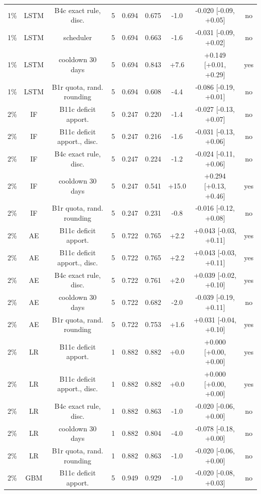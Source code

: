 \documentclass[10pt,onecolumn,letterpaper]{article}
\begin{document}
\begin{table}[!t]
{\begin{tabular}{lcccccccc}
1\% & LSTM & B4c exact rule, disc. & 5 & 0.694 & 0.675 & -1.0 & -0.020 [-0.09, +0.05] & no \\
1\% & LSTM & scheduler & 5 & 0.694 & 0.663 & -1.6 & -0.031 [-0.09, +0.02] & no \\
1\% & LSTM & cooldown 30 days & 5 & 0.694 & 0.843 & +7.6 & +0.149 [+0.01, +0.29] & yes \\
1\% & LSTM & B1r quota, rand. rounding & 5 & 0.694 & 0.608 & -4.4 & -0.086 [-0.19, +0.01] & no \\
2\% & IF & B11c deficit apport. & 5 & 0.247 & 0.220 & -1.4 & -0.027 [-0.13, +0.07] & no \\
2\% & IF & B11c deficit apport., disc. & 5 & 0.247 & 0.216 & -1.6 & -0.031 [-0.13, +0.06] & no \\
2\% & IF & B4c exact rule, disc. & 5 & 0.247 & 0.224 & -1.2 & -0.024 [-0.11, +0.06] & no \\
2\% & IF & cooldown 30 days & 5 & 0.247 & 0.541 & +15.0 & +0.294 [+0.13, +0.46] & yes \\
2\% & IF & B1r quota, rand. rounding & 5 & 0.247 & 0.231 & -0.8 & -0.016 [-0.12, +0.08] & no \\
2\% & AE & B11c deficit apport. & 5 & 0.722 & 0.765 & +2.2 & +0.043 [-0.03, +0.11] & yes \\
2\% & AE & B11c deficit apport., disc. & 5 & 0.722 & 0.765 & +2.2 & +0.043 [-0.03, +0.11] & yes \\
2\% & AE & B4c exact rule, disc. & 5 & 0.722 & 0.761 & +2.0 & +0.039 [-0.02, +0.10] & yes \\
2\% & AE & cooldown 30 days & 5 & 0.722 & 0.682 & -2.0 & -0.039 [-0.19, +0.11] & no \\
2\% & AE & B1r quota, rand. rounding & 5 & 0.722 & 0.753 & +1.6 & +0.031 [-0.04, +0.10] & yes \\
2\% & LR & B11c deficit apport. & 1 & 0.882 & 0.882 & +0.0 & +0.000 [+0.00, +0.00] & yes \\
2\% & LR & B11c deficit apport., disc. & 1 & 0.882 & 0.882 & +0.0 & +0.000 [+0.00, +0.00] & yes \\
2\% & LR & B4c exact rule, disc. & 1 & 0.882 & 0.863 & -1.0 & -0.020 [-0.06, +0.00] & no \\
2\% & LR & cooldown 30 days & 1 & 0.882 & 0.804 & -4.0 & -0.078 [-0.18, +0.00] & no \\
2\% & LR & B1r quota, rand. rounding & 1 & 0.882 & 0.863 & -1.0 & -0.020 [-0.06, +0.00] & no \\
2\% & GBM & B11c deficit apport. & 5 & 0.949 & 0.929 & -1.0 & -0.020 [-0.08, +0.03] & no \\

\end{tabular}}
\end{table}
\end{document}
